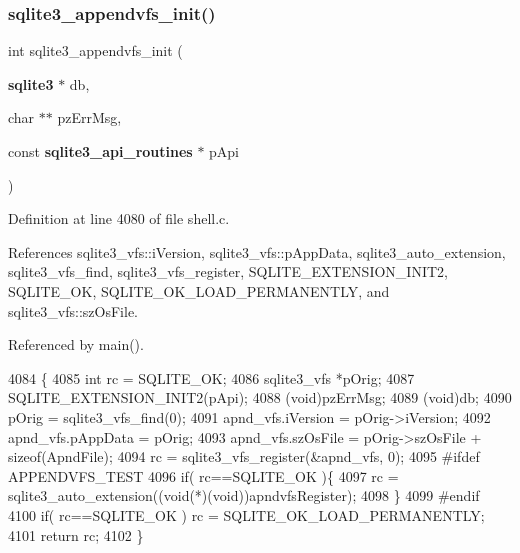 \subsubsection{sqlite3\+\_\+appendvfs\+\_\+init()}
{\footnotesize\ttfamily int sqlite3\+\_\+appendvfs\+\_\+init (\begin{DoxyParamCaption}\item[{\textbf{ sqlite3} $\ast$}]{db,  }\item[{char $\ast$$\ast$}]{pz\+Err\+Msg,  }\item[{const \textbf{ sqlite3\+\_\+api\+\_\+routines} $\ast$}]{p\+Api }\end{DoxyParamCaption})}



Definition at line 4080 of file shell.\+c.



References sqlite3\+\_\+vfs\+::i\+Version, sqlite3\+\_\+vfs\+::p\+App\+Data, sqlite3\+\_\+auto\+\_\+extension, sqlite3\+\_\+vfs\+\_\+find, sqlite3\+\_\+vfs\+\_\+register, S\+Q\+L\+I\+T\+E\+\_\+\+E\+X\+T\+E\+N\+S\+I\+O\+N\+\_\+\+I\+N\+I\+T2, S\+Q\+L\+I\+T\+E\+\_\+\+OK, S\+Q\+L\+I\+T\+E\+\_\+\+O\+K\+\_\+\+L\+O\+A\+D\+\_\+\+P\+E\+R\+M\+A\+N\+E\+N\+T\+LY, and sqlite3\+\_\+vfs\+::sz\+Os\+File.



Referenced by main().


\begin{DoxyCode}
4084  \{
4085   \textcolor{keywordtype}{int} rc = SQLITE_OK;
4086   sqlite3_vfs *pOrig;
4087   SQLITE_EXTENSION_INIT2(pApi);
4088   (void)pzErrMsg;
4089   (void)db;
4090   pOrig = sqlite3_vfs_find(0);
4091   apnd_vfs.iVersion = pOrig->iVersion;
4092   apnd_vfs.pAppData = pOrig;
4093   apnd_vfs.szOsFile = pOrig->szOsFile + \textcolor{keyword}{sizeof}(ApndFile);
4094   rc = sqlite3_vfs_register(&apnd_vfs, 0);
4095 \textcolor{preprocessor}{#ifdef APPENDVFS\_TEST}
4096   \textcolor{keywordflow}{if}( rc==SQLITE_OK )\{
4097     rc = sqlite3_auto_extension((\textcolor{keywordtype}{void}(*)(\textcolor{keywordtype}{void}))apndvfsRegister);
4098   \}
4099 \textcolor{preprocessor}{#endif}
4100   \textcolor{keywordflow}{if}( rc==SQLITE_OK ) rc = SQLITE_OK_LOAD_PERMANENTLY;
4101   \textcolor{keywordflow}{return} rc;
4102 \}
\end{DoxyCode}
\mbox{\label{shell_8c_abe13f95f7293ae4f318bae2cd75090bc}} 
